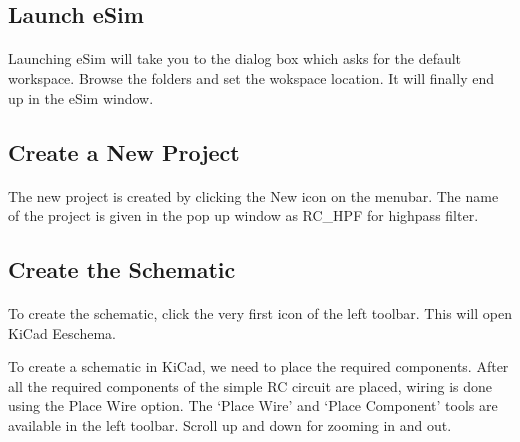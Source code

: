 \subsection*{Launch eSim}

\paragraph{}
 Launching eSim will take you to the dialog box which asks for the default workspace. Browse the folders and set the wokspace location. It will finally end up in the eSim window.%

\subsection*{Create a New Project}

\paragraph{ } The new project is created by clicking the New icon on the
menubar. The name of the project is given in the pop up window as RC\_HPF for highpass filter.
\subsection*{Create the Schematic}

\paragraph{}  To create the schematic, click the very first icon of the
left toolbar. This will open KiCad Eeschema.


To create a schematic in KiCad, we need to place the required components. After all the required components of the simple RC circuit are placed, wiring is
done using the Place Wire option. The `Place Wire' and `Place Component' tools are available in the left toolbar. Scroll up and down for zooming in and out.




